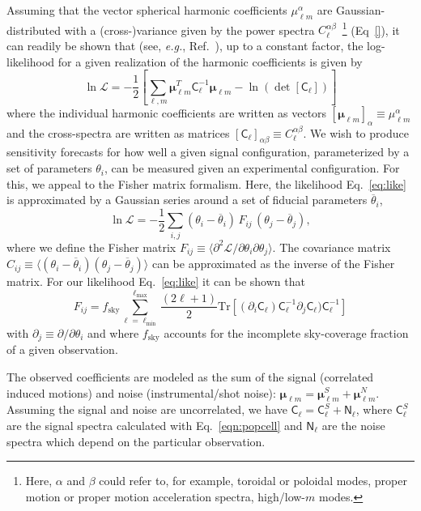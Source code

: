 \documentclass[prd,aps,10pt,nofootinbib,twocolumn,superscriptaddress,preprintnumbers,balancelastpage,longbibliography]{revtex4-1}
\newcommand{\vect}[1]{\boldsymbol{\mathbf{#1}}}
\newcommand{\ellm}{{\ell m}}
\begin{document}
Assuming that the vector spherical harmonic coefficients $\mu_\ellm^{\alpha}$ are Gaussian-distributed with a (cross-)variance given by the power spectra $C_\ell^{\alpha\beta}$~\footnote{Here, $\alpha$ and $\beta$ could refer to, for example, toroidal or poloidal modes, proper motion or proper motion acceleration spectra, high/low-$m$ modes.} (Eq~\ref{}), it can readily be shown that (see, \emph{e.g.}, Ref.~\cite{}), up to a constant factor,  the log-likelihood for a given realization of the harmonic coefficients is given by 
\begin{equation}
\ln \mathcal L = -\frac{1}{2}\left[\sum_{\ell,m}\vect{\mu}_\ellm^T\mathsf C_\ell^{-1}\vect{\mu}_\ellm - \ln(\det[\mathsf C_\ell])\right]
\label{eq:like}
\end{equation}
where the individual harmonic coefficients are written as vectors $[\vect{\mu}_\ellm]_\alpha \equiv \mu_\ellm^\alpha$ and the cross-spectra are written as matrices $[\mathsf C_\ell]_{\alpha\beta}\equiv C_\ell^{\alpha\beta}$. We wish to produce sensitivity forecasts for how well a given signal configuration, parameterized by a set of parameters ${\theta_i}$, can be measured given an experimental configuration. For this, we appeal to the Fisher matrix formalism. Here, the likelihood Eq.~\ref{eq:like} is approximated by a Gaussian series around a set of fiducial parameters ${\overline{\theta}_i}$,
\begin{equation}
\ln \mathcal L = -\frac{1}{2}\sum_{i,j}(\theta_i - \overline{\theta}_i)\,F_{ij}\,(\theta_j - \overline{\theta}_j),
\end{equation}
where we define the Fisher matrix $F_{ij}\equiv\langle\partial^2\mathcal{L}/\partial\theta_i\partial\theta_j\rangle$. The covariance matrix $C_{ij}\equiv \langle(\theta_i - \overline\theta_i)(\theta_j - \overline\theta_j)\rangle$ can be approximated as the inverse of the Fisher matrix. For our likelihood Eq.~\ref{eq:like} it can be shown that
\begin{equation}
F_{ij} = f_\mathrm{sky}\sum_{\ell=\ell_\mathrm{min}}^{\ell_\mathrm{max}}\frac{(2\ell + 1)}{2}\mathrm{Tr}\left[(\partial_i\mathsf C_\ell)\mathsf C_\ell^{-1}\partial_j\mathsf C_\ell)\mathsf C_\ell^{-1}\right]
\label{eq:fisher}
\end{equation}
with $\partial_j\equiv\partial/\partial\theta_i$ and where $f_\mathrm{sky}$ accounts for the incomplete sky-coverage fraction of a given observation.

The observed coefficients are modeled as the sum of the signal (correlated induced motions) and noise (instrumental/shot noise): $\vect{\mu}_\ellm =\vect{\mu}_\ellm^S + \vect{\mu}_\ellm^N$. Assuming the signal and noise are uncorrelated, we have $\mathsf{C}_\ell = \mathsf{C}_\ell^S + \mathsf{N}_\ell$, where $\mathsf{C}_\ell^S$ are the signal spectra calculated with Eq.~\ref{eqn:popcell} and $\mathsf{N}_\ell$ are the noise spectra which depend on the particular observation.
\end{document}
